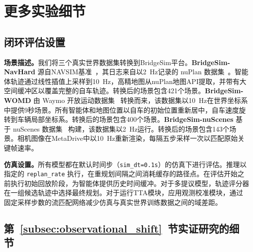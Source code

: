\documentclass{article}
\begin{document}
\section{更多实验细节}

\subsection{闭环评估设置}
\label{appendix:cl_eval_details}
\textbf{场景描述。}我们将三个真实世界数据集转换到BridgeSim平台。\textbf{BridgeSim-NavHard} 源自NAVSIM基准~\cite{navsimv1}，其日志来自以2~Hz记录的 nuPlan 数据集~\cite{caesar2021nuplan}。智能体轨迹通过线性插值上采样到10~Hz，高精地图从nuPlan地图API提取，并带有大空间缓冲区以覆盖完整的自车轨迹。转换后的场景包含421个场景。\textbf{BridgeSim-WOMD} 由 Waymo 开放运动数据集~\cite{ettinger2021large} 转换而来，该数据集以10~Hz在世界坐标系中提供9秒场景。所有智能体和地图位置以自车的初始位置重新居中，自车速度旋转到车辆局部坐标系。转换后的场景包含400个场景。\textbf{BridgeSim-nuScenes} 基于 nuScenes 数据集~\cite{caesar2020nuscenes} 构建，该数据集以2~Hz运行。转换后的场景包含143个场景。相机图像在MetaDrive中以10~Hz重新渲染，每隔五步采样一次以匹配原始关键帧速率。

\noindent \textbf{仿真设置。}所有模型都在默认时间步（\texttt{sim\_dt=0.1s}）的仿真下进行评估。推理以指定的 \texttt{replan\_rate} 执行，在重规划间隔之间消耗缓存的路径点。在评估开始之前执行初始回放阶段，为智能体提供历史时间缓冲。对于多提议模型，轨迹评分器在一组候选轨迹中选择最终规划。对于运行TTA模块，应用观测校准模块，通过固定采样步数的流匹配网络减少仿真与真实世界训练数据之间的域差距。


\subsection{第~\ref{subsec:observational_shift}~节实证研究的细节}
\label{appendix:observational_shift_details}
\end{document}
